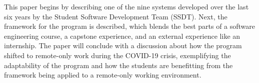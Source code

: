 This paper begins by describing one of the nine systems developed over the last six years by the Student Software Development Team (SSDT). Next, the framework for the program is described, which blends the best parts of a software engineering course, a capstone experience, and an external experience like an internship. The paper will conclude with a discussion about how the program shifted to remote-only work during the COVID-19 crisis, exemplifying the adaptability of the program and how the students are benefitting from the framework being applied to a remote-only working environment.
